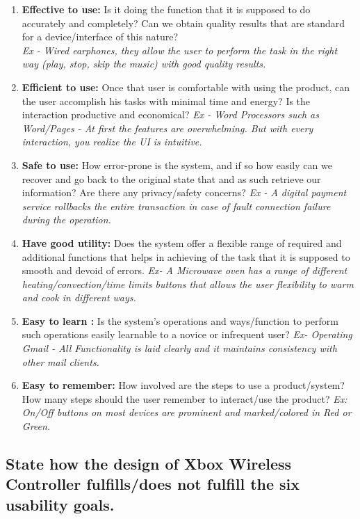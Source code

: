 \documentclass[10pt]{scrartcl}
\begin{document}
	\begin{enumerate}
		\item \textbf{Effective to use:} Is it doing the function that it is supposed to do accurately and completely? Can we obtain quality results that are standard for a device/interface of this nature?\\
	\emph{Ex - Wired earphones, they allow the user to perform the task in the right way (play, stop, skip the music) with good quality results.} 
		\item  \textbf{Efficient to use:} Once that user is comfortable with using the product, can the user accomplish his tasks with minimal time and energy? Is the interaction productive and economical?
		\emph{Ex - Word Processors such as Word/Pages - At first the features are overwhelming. But with every interaction, you realize the UI is intuitive.}
		
		\item\textbf{Safe to use: }How error-prone is the system, and if so how easily can we recover and go back to the original state that and as such retrieve our information? Are there any privacy/safety concerns?
		\emph{Ex - A digital payment service rollbacks the entire transaction in case of fault connection failure during the operation.}
		
		\item \textbf{Have good utility:} Does the system offer a flexible range of required and additional functions that helps in achieving of the task that it is supposed to smooth and devoid of errors. 
		\emph{Ex- A Microwave oven has a range of different heating/convection/time limits buttons that allows the user flexibility to warm and cook in different ways.}
		
		\item \textbf{Easy to learn :} Is the system’s operations and ways/function to perform such operations easily learnable to a novice or infrequent user? \emph{Ex- Operating Gmail - All Functionality is laid clearly and it maintains consistency with other mail clients.}
		
		\item \textbf{Easy to remember:} How involved are the steps to use a product/system? How many steps should the user remember to interact/use the product?
		\emph{Ex: On/Off buttons on most devices are prominent and marked/colored in Red or Green.}
				
	\end{enumerate}
	
\subsection{State how the design of Xbox Wireless Controller fulfills/does not fulfill the six usability goals.}
\end{document}
